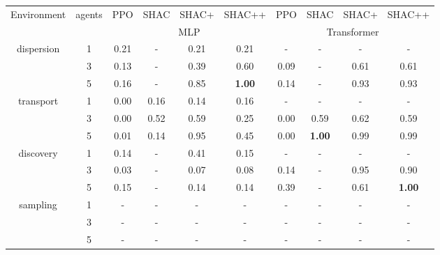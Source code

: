 \begin{tabular}{ c c c c c c c c c c }
\toprule
\multirow{2}{*}{Environment} & \multirow{2}{*}{agents} & PPO & SHAC & SHAC+ & SHAC++ & PPO & SHAC & SHAC+ & SHAC++ \\
 & & \multicolumn{4}{c}{MLP} & \multicolumn{4}{c}{Transformer} \\
\midrule
\multirow{3}{*}{dispersion}& 1 & 0.21 & - & 0.21 & 0.21 & - & - & - & - \\
& 3 & 0.13 & - & 0.39 & 0.60 & 0.09 & - & 0.61 & 0.61 \\
& 5 & 0.16 & - & 0.85 & \textbf{1.00} & 0.14 & - & 0.93 & 0.93 \\
\multirow{3}{*}{transport}& 1 & 0.00 & 0.16 & 0.14 & 0.16 & - & - & - & - \\
& 3 & 0.00 & 0.52 & 0.59 & 0.25 & 0.00 & 0.59 & 0.62 & 0.59 \\
& 5 & 0.01 & 0.14 & 0.95 & 0.45 & 0.00 & \textbf{1.00} & 0.99 & 0.99 \\
\multirow{3}{*}{discovery}& 1 & 0.14 & - & 0.41 & 0.15 & - & - & - & - \\
& 3 & 0.03 & - & 0.07 & 0.08 & 0.14 & - & 0.95 & 0.90 \\
& 5 & 0.15 & - & 0.14 & 0.14 & 0.39 & - & 0.61 & \textbf{1.00} \\
\multirow{3}{*}{sampling}& 1 & - & - & - & - & - & - & - & - \\
& 3 & - & - & - & - & - & - & - & - \\
& 5 & - & - & - & - & - & - & - & - \\
\bottomrule
\end{tabular}
